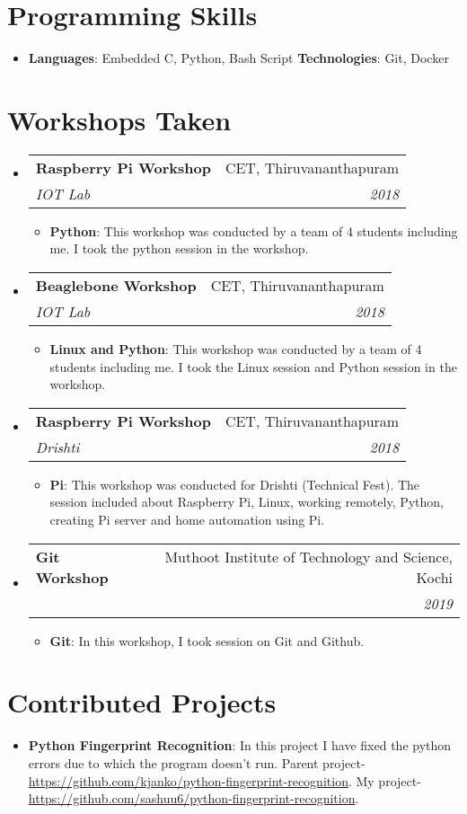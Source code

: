 \documentclass[letterpaper,11pt]{article}
\makeatletter
\newcommand{\resumeItem}[2]{
  \item\small{
    \textbf{#1}{: #2 \vspace{-2pt}}
  }
}
\newcommand{\resumeSubheading}[4]{
  \vspace{-1pt}\item
    \begin{tabular*}{0.97\textwidth}[t]{l@{\extracolsep{\fill}}r}
      \textbf{#1} & #2 \\
      \textit{\small#3} & \textit{\small #4} \\
    \end{tabular*}\vspace{-5pt}
}
\newcommand{\resumeSubItem}[2]{\resumeItem{#1}{#2}\vspace{-4pt}}
\newcommand{\resumeSubHeadingListStart}{\begin{itemize}[leftmargin=*]}
\newcommand{\resumeSubHeadingListEnd}{\end{itemize}}
\newcommand{\resumeItemListStart}{\begin{itemize}}
\newcommand{\resumeItemListEnd}{\end{itemize}\vspace{-5pt}}
\makeatother
\begin{document}
\section{Programming Skills}
  \resumeSubHeadingListStart
    \item{
      \textbf{Languages}{: Embedded C, Python, Bash Script}
      \hfill
      \textbf{Technologies}{: Git, Docker }
    }
  \resumeSubHeadingListEnd

\section{Workshops Taken}
  \resumeSubHeadingListStart
    \resumeSubheading
      {Raspberry Pi Workshop}{CET, Thiruvananthapuram}
      {IOT Lab}{2018}
      \resumeItemListStart
        \resumeItem{Python}
          {This workshop was conducted by a team of 4 students including me. I took the python session in the workshop.}
      \resumeItemListEnd
      
      \resumeSubheading
      {Beaglebone Workshop}{CET, Thiruvananthapuram}
      {IOT Lab}{2018}
      \resumeItemListStart
        \resumeItem{Linux and Python}
          {This workshop was conducted by a team of 4 students including me. I took the Linux session and Python session in the workshop.}
      \resumeItemListEnd
      
      \resumeSubheading
      {Raspberry Pi Workshop}{CET, Thiruvananthapuram}
      {Drishti}{2018}
      \resumeItemListStart
        \resumeItem{Pi}
          {This workshop was conducted for Drishti (Technical Fest). The session included about Raspberry Pi, Linux, working remotely, Python, creating Pi server and home automation using Pi.}
      \resumeItemListEnd
      
      \resumeSubheading
      {Git Workshop}{Muthoot Institute of Technology and Science, Kochi}
      {}{2019}
      \resumeItemListStart
        \resumeItem{Git}
          {In this workshop, I took session on Git and Github.}
      \resumeItemListEnd
      
  \resumeSubHeadingListEnd

\section{Contributed Projects}
  \resumeSubHeadingListStart
    \resumeSubItem{Python Fingerprint Recognition}
      { In this project I have fixed the python errors due to which the program doesn't run. Parent project-\url{https://github.com/kjanko/python-fingerprint-recognition}. My project-\url{https://github.com/sashuu6/python-fingerprint-recognition}.}
  \resumeSubHeadingListEnd
\end{document}
